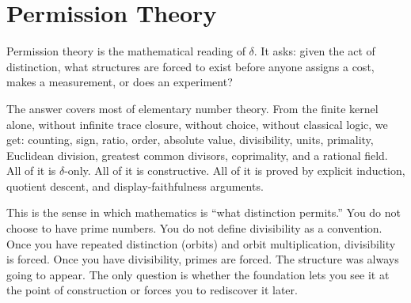 \documentclass[11pt,a4paper]{article}
\theoremstyle{definition}
\theoremstyle{remark}
\begin{document}
\section{Permission Theory}\label{sec:permission}

Permission theory is the mathematical reading of $\delta$. It asks: given the
act of distinction, what structures are forced to exist before anyone assigns a
cost, makes a measurement, or does an experiment?

The answer covers most of elementary number theory. From the finite kernel alone, without
infinite trace closure, without choice, without classical logic, we get:
counting, sign, ratio, order, absolute value, divisibility, units, primality,
Euclidean division, greatest common divisors, coprimality, and a rational
field. All of it is $\delta$-only. All of it is constructive. All of it is
proved by explicit induction, quotient descent, and display-faithfulness
arguments.

This is the sense in which mathematics is ``what distinction permits.'' You do
not choose to have prime numbers. You do not define divisibility as a
convention. Once you have repeated distinction (orbits) and orbit
multiplication, divisibility is forced. Once you have divisibility, primes are
forced. The structure was always going to appear. The only question is whether
the foundation lets you see it at the point of construction or forces you to
rediscover it later.
\end{document}
